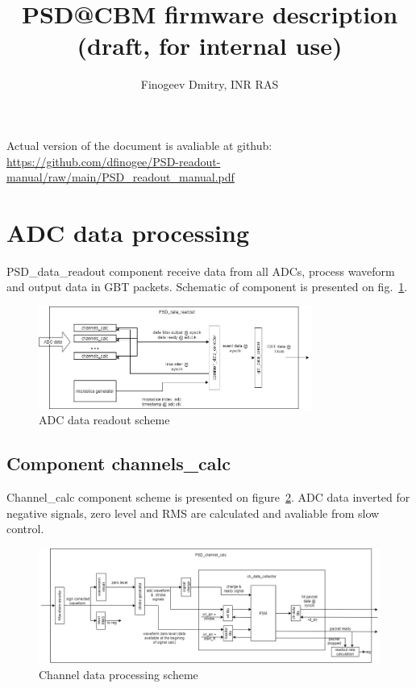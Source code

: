 \documentclass{article}
\title{PSD@CBM firmware description (draft, for internal use)}
\author{Finogeev Dmitry, INR RAS}
\begin{document}
\maketitle

Actual version of the document is avaliable at github:
\newline
\url{https://github.com/dfinogee/PSD-readout-manual/raw/main/PSD_readout_manual.pdf}



\tableofcontents

\newpage

\section{ADC data processing}
PSD\_data\_readout component receive data from all ADCs, process waveform and output data in GBT packets. Schematic of component is presented on fig.~\ref{fig:1}.

\begin{figure}[H]
	\centering 
	\includegraphics[width=0.8\textwidth]{ADC_readout.png}
	\caption{\label{fig:1} ADC data readout scheme}
\end{figure}




\subsection{Component channels\_calc}
Channel\_calc component scheme is presented on figure~\ref{fig:2}. ADC data inverted for negative signals, zero level and RMS are calculated and avaliable from slow control.


\begin{figure}[H]
	\centering 
	\includegraphics[width=1.0\textwidth]{ADC_event_collection.png}
	\caption{\label{fig:2} Channel data processing scheme}
\end{figure}
\end{document}
